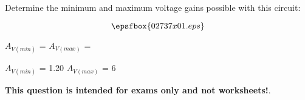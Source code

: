 

Determine the minimum and maximum voltage gains possible with this circuit:

$$\epsfbox{02737x01.eps}$$

$A_{V(min)}$ = \hskip 80pt $A_{V(max)}$ =







$A_{V(min)}$ = 1.20 \hskip 30pt $A_{V(max)}$ = 6







{\bf This question is intended for exams only and not worksheets!}.





